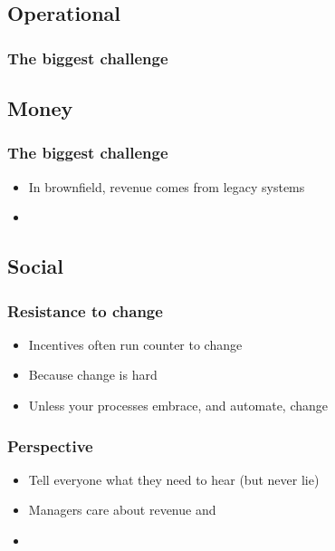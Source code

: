 \documentclass[t]{beamer}
\begin{document}
\subsection{Operational}

\begin{frame}
	\frametitle{The biggest challenge}
	\begin{itemize}
	\end{itemize}
\end{frame}

\subsection{Money}

\begin{frame}
	\frametitle{The biggest challenge}
	\begin{itemize}
		\item In brownfield, revenue comes from legacy systems
		\item 
	\end{itemize}
\end{frame}

\subsection{Social}

\begin{frame}
	\frametitle{Resistance to change}
	\begin{itemize}
		\item Incentives often run counter to change
		\item Because change is hard
		\item Unless your processes embrace, and automate, change
	\end{itemize}
\end{frame}

\begin{frame}
	\frametitle{Perspective}
	\begin{itemize}
		\item Tell everyone what they need to hear (but never lie)
		\item Managers care about revenue and %
		\item 
	\end{itemize}
\end{frame}
\end{document}
